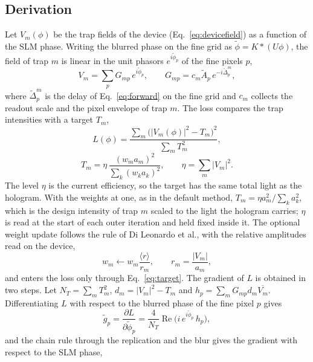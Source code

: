 \subsection{Derivation}\label{sec:derivation}

Let $V_m(\phi)$ be the trap fields of the device (Eq.~\ref{eq:devicefield}) as a function of the SLM phase. Writing the blurred phase on the fine grid as $\tilde\phi=K*(U\phi)$, the field of trap $m$ is linear in the unit phasors $e^{i\tilde\phi_p}$ of the fine pixels $p$,
\begin{equation}
V_m=\sum_pG_{mp}\,e^{i\tilde\phi_p},\qquad G_{mp}=c_m\tilde A_p\,e^{-i\tilde\Delta_p^m},\label{eq:linear}
\end{equation}
where $\tilde\Delta_p^m$ is the delay of Eq.~\ref{eq:forward} on the fine grid and $c_m$ collects the readout scale and the pixel envelope of trap $m$. The loss compares the trap intensities with a target $T_m$,
\begin{equation}
L(\phi)=\frac{\sum_m\big(|V_m(\phi)|^2-T_m\big)^2}{\sum_mT_m^2},\label{eq:loss}
\end{equation}
\begin{equation}
T_m=\eta\,\frac{(w_ma_m)^2}{\sum_k(w_ka_k)^2},\qquad \eta=\sum_m|V_m|^2.\label{eq:target}
\end{equation}
The level $\eta$ is the current efficiency, so the target has the same total light as the hologram. With the weights at one, as in the default method, $T_m=\eta a_m^2/\sum_ka_k^2$, which is the design intensity of trap $m$ scaled to the light the hologram carries; $\eta$ is read at the start of each outer iteration and held fixed inside it. The optional weight update follows the rule of Di Leonardo et al., with the relative amplitudes read on the device,
\begin{equation}
w_m\leftarrow w_m\frac{\langle r\rangle}{r_m},\qquad r_m=\frac{|V_m|}{a_m},\label{eq:weights}
\end{equation}
and enters the loss only through Eq.~\ref{eq:target}. The gradient of $L$ is obtained in two steps. Let $N_T=\sum_mT_m^2$, $d_m=|V_m|^2-T_m$ and $h_p=\sum_mG_{mp}d_m\overline{V_m}$. Differentiating $L$ with respect to the blurred phase of the fine pixel $p$ gives
\begin{equation}
\tilde g_p=\frac{\partial L}{\partial\tilde\phi_p}=\frac{4}{N_T}\operatorname{Re}\!\big(i\,e^{i\tilde\phi_p}\,h_p\big),\label{eq:gradfine}
\end{equation}
and the chain rule through the replication and the blur gives the gradient with respect to the SLM phase,
